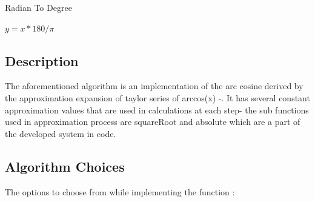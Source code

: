 \documentclass[a4paper,12pt]{article}
\begin{document}
    \begin{algorithm}
    \caption{Radian To Degree}
    $y = x * 180/\pi$\;
    \end{algorithm}
\subsection{Description}
    The aforementioned algorithm is an implementation of the arc cosine derived by the approximation expansion of taylor series of arccos(x) -\cite{Abramowitz Book}. It has several constant approximation values that are used in calculations at each step- the sub functions used in approximation process are squareRoot and absolute which are a part of the developed system in code.
\subsection{Algorithm Choices}
    The options to choose from while implementing the function :
\end{document}
